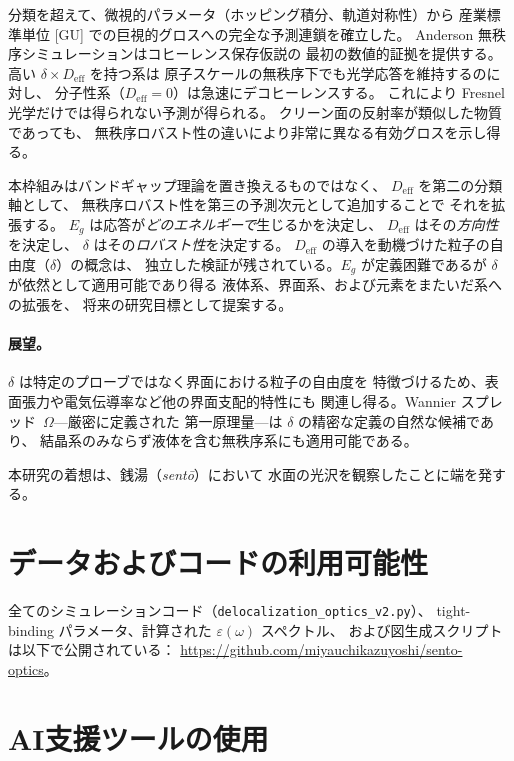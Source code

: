 \documentclass[twocolumn,showpacs,preprintnumbers,amsmath,amssymb,prb]{revtex4-2}
\begin{document}
分類を超えて、微視的パラメータ（ホッピング積分、軌道対称性）から
産業標準単位 [GU] での巨視的グロスへの完全な予測連鎖を確立した。
Anderson 無秩序シミュレーションはコヒーレンス保存仮説の
最初の数値的証拠を提供する。
高い $\delta \times D_\mathrm{eff}$ を持つ系は
原子スケールの無秩序下でも光学応答を維持するのに対し、
分子性系（$D_\mathrm{eff} = 0$）は急速にデコヒーレンスする。
これにより Fresnel 光学だけでは得られない予測が得られる。
クリーン面の反射率が類似した物質であっても、
無秩序ロバスト性の違いにより非常に異なる有効グロスを示し得る。

本枠組みはバンドギャップ理論を置き換えるものではなく、
$D_\mathrm{eff}$ を第二の分類軸として、
無秩序ロバスト性を第三の予測次元として追加することで
それを拡張する。
$E_g$ は応答が\emph{どのエネルギーで}生じるかを決定し、
$D_\mathrm{eff}$ はその\emph{方向性}を決定し、
$\delta$ はその\emph{ロバスト性}を決定する。
$D_\mathrm{eff}$ の導入を動機づけた粒子の自由度（$\delta$）の概念は、
独立した検証が残されている。$E_g$ が定義困難であるが
$\delta$ が依然として適用可能であり得る
液体系、界面系、および元素をまたいだ系への拡張を、
将来の研究目標として提案する。
\paragraph{展望。}
$\delta$ は特定のプローブではなく界面における粒子の自由度を
特徴づけるため、表面張力や電気伝導率など他の界面支配的特性にも
関連し得る。Wannier スプレッド~$\Omega$---厳密に定義された
第一原理量---は $\delta$ の精密な定義の自然な候補であり、
結晶系のみならず液体を含む無秩序系にも適用可能である。

\begin{acknowledgments}
本研究の着想は、銭湯（\textit{sent\=o}）において
水面の光沢を観察したことに端を発する。
\end{acknowledgments}

\section*{データおよびコードの利用可能性}

全てのシミュレーションコード（\texttt{delocalization\_optics\_v2.py}）、
tight-binding パラメータ、計算された $\varepsilon(\omega)$ スペクトル、
および図生成スクリプトは以下で公開されている：
\url{https://github.com/miyauchikazuyoshi/sento-optics}。

\section*{AI支援ツールの使用}
\end{document}
